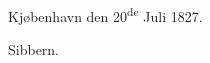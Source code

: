 \documentclass[12pt]{book}
\def\sperr#1{#1}%
\def\textit#1{#1}%
\def\emph#1{#1}%
\def\\{ }%
\newcommand{\sperr}[1]{\textls[180]{#1}}
\newcommand{\ovhead}[1]{%
  \begin{center}{\Large\sperr{#1}}\\[1.2ex]\rule{0.30\linewidth}{0.4pt}\end{center}
  \vspace{0.6\baselineskip}
}
\newcommand{\ovside}{\par\nopagebreak\hfill{\footnotesize Side.}\par\nobreak\vspace{0.2\baselineskip}}
\newcommand{\ovgroup}[1]{%
  \par\vspace{0.7\baselineskip}\begin{center}{#1\par}\end{center}
  \vspace{0.3\baselineskip}}
\newcommand{\ovcap}[2]{%
  \par\vspace{1.0\baselineskip}%
  \begin{center}{\sperr{#1}\par}\vspace{0.3\baselineskip}{#2\par}\end{center}
  \vspace{0.4\baselineskip}}
\newcommand{\ovrubrik}[2]{%
  \par\vspace{0.9\baselineskip}%
  \begin{center}{\textit{#1}\par}\vspace{0.25\baselineskip}{#2\par}\end{center}
  \vspace{0.4\baselineskip}}
\newcommand{\ovnote}[1]{%
  \par\vspace{0.5\baselineskip}\begin{center}\begin{minipage}{0.86\linewidth}
  \centering #1\end{minipage}\end{center}\vspace{0.4\baselineskip}}
\newcommand{\ovline}[3]{%
  \par\vspace{0.25\baselineskip}%
  \noindent\hangindent=2.8em\hangafter=1
  \textit{\S.\,#1.}\quad #2%
  \nobreak\ \leaders\hbox to 0.55em{\hss.\hss}\hfill\ \textit{#3}\par}
\begin{document}
\begin{center}
  Kjøbenhavn den 20\textsuperscript{de} Juli 1827.
\end{center}
\begin{flushright}
  Sibbern.
\end{flushright}

\cleardoublepage
\pagestyle{fancy}

%
%
%
%
\end{document}
